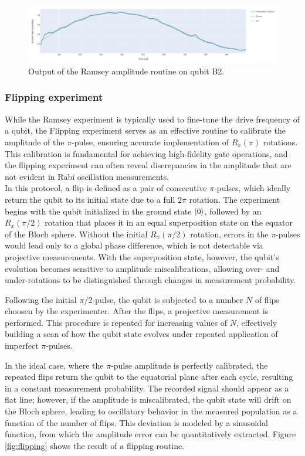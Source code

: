 \begin{figure}[h!]
    \centering
    \includegraphics[width=\textwidth]{figures/png/ramsey.png}
    \caption{Output of the Ramsey amplitude routine on qubit B2.}
    \label{fig:ramsey}
\end{figure}

\subsubsection{Flipping experiment}\label{subsec:Flipping}

While the Ramsey experiment is typically used to fine-tune the drive frequency of a qubit, the Flipping experiment serves as an effective routine to calibrate the amplitude of the $\pi$-pulse, ensuring accurate implementation of $R_x(\pi)$ rotations. 
This calibration is fundamental for achieving high-fidelity gate operations, and the flipping experiment can often reveal discrepancies in the amplitude that are not evident in Rabi oscillation measurements.\\
In this protocol, a flip is defined as a pair of consecutive $\pi$-pulses, which ideally return the qubit to its initial state due to a full $2\pi$ rotation. 
The experiment begins with the qubit initialized in the ground state $\ket{0}$, followed by an $R_x(\pi/2)$ rotation that places it in an equal superposition state on the equator of the Bloch sphere. 
Without the initial $R_x(\pi/2)$ rotation, errors in the $\pi$-pulses would lead only to a global phase difference, which is not detectable via projective measurements. 
With the superposition state, however, the qubit's evolution becomes sensitive to amplitude miscalibrations, allowing over- and under-rotations to be distinguished through changes in measurement probability.

Following the initial $\pi/2$-pulse, the qubit is subjected to a number $N$ of flips choosen by the experimenter. 
After the flips, a projective measurement is performed. This procedure is repeated for increasing values of $N$, effectively building a scan of how the qubit state evolves under repeated application of imperfect $\pi$-pulses.

In the ideal case, where the $\pi$-pulse amplitude is perfectly calibrated, the repeated flips return the qubit to the equatorial plane after each cycle, resulting in a constant measurement probability. 
The recorded signal should appear as a flat line; however, if the amplitude is miscalibrated, the qubit state will drift on the Bloch sphere, leading to oscillatory behavior in the measured population as a function of the number of flips. 
This deviation is modeled by a sinusoidal function, from which the amplitude error can be quantitatively extracted.
Figure \ref{fig:flipping} shows the result of a flipping routine.

